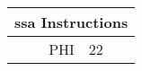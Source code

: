 \begin{tabular}{|r|l|}\hline
\multicolumn{2}{|c|}{ssa Instructions}\\ \hline
PHI & 22 \\ \hline
\end{tabular}
